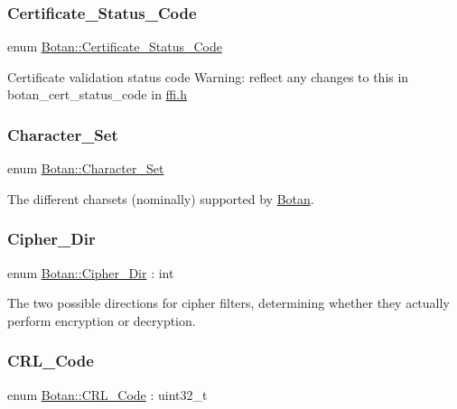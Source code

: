 \subsubsection{\texorpdfstring{Certificate\+\_\+\+Status\+\_\+\+Code}{Certificate\_Status\_Code}}
{\footnotesize\ttfamily enum \hyperlink{namespace_botan_ae1e907dc90937bdda30f65216e68ff2b}{Botan\+::\+Certificate\+\_\+\+Status\+\_\+\+Code}\hspace{0.3cm}{\ttfamily [strong]}}

Certificate validation status code Warning\+: reflect any changes to this in botan\+\_\+cert\+\_\+status\+\_\+code in \hyperlink{ffi_8h_source}{ffi.\+h} \mbox{\label{namespace_botan_a416eb1af7496d74b885a20ff833e9b33}} 
\subsubsection{\texorpdfstring{Character\+\_\+\+Set}{Character\_Set}}
{\footnotesize\ttfamily enum \hyperlink{namespace_botan_a416eb1af7496d74b885a20ff833e9b33}{Botan\+::\+Character\+\_\+\+Set}}

The different charsets (nominally) supported by \hyperlink{namespace_botan}{Botan}. \mbox{\label{namespace_botan_a8d9547a8fb3e868810b169b20ac389ee}} 
\subsubsection{\texorpdfstring{Cipher\+\_\+\+Dir}{Cipher\_Dir}}
{\footnotesize\ttfamily enum \hyperlink{namespace_botan_a8d9547a8fb3e868810b169b20ac389ee}{Botan\+::\+Cipher\+\_\+\+Dir} \+: int}

The two possible directions for cipher filters, determining whether they actually perform encryption or decryption. \mbox{\label{namespace_botan_a557e654e0c387a4ef2521e3ece516ca7}} 
\subsubsection{\texorpdfstring{C\+R\+L\+\_\+\+Code}{CRL\_Code}}
{\footnotesize\ttfamily enum \hyperlink{namespace_botan_a557e654e0c387a4ef2521e3ece516ca7}{Botan\+::\+C\+R\+L\+\_\+\+Code} \+: uint32\+\_\+t}

